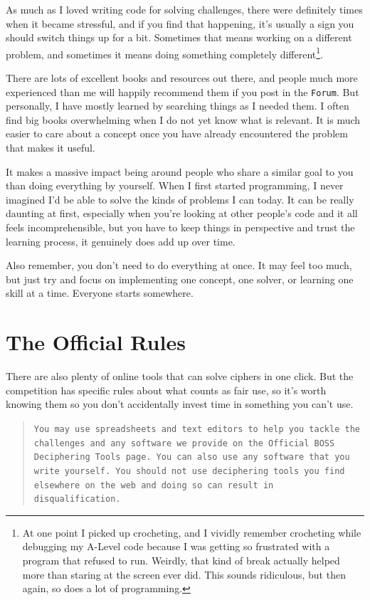 As much as I loved writing code for solving challenges, there were definitely times when it became stressful, and if you find that happening, it’s usually a sign you should switch things up for a bit. Sometimes that means working on a different problem, and sometimes it means doing something completely different\footnote{At one point I picked up crocheting, and I vividly remember crocheting while debugging my A-Level code because I was getting so frustrated with a program that refused to run. Weirdly, that kind of break actually helped more than staring at the screen ever did. This sounds ridiculous, but then again, so does a lot of programming.}. 

There are lots of excellent books and resources out there, and people much more experienced than me will happily recommend them if you post in the \texttt{Forum}. But personally, I have mostly learned by searching things as I needed them. I often find big books overwhelming when I do not yet know what is relevant. It is much easier to care about a concept once you have already encountered the problem that makes it useful.

It makes a massive impact being around people who share a similar goal to you than doing everything by yourself. When I first started programming, I never imagined I’d be able to solve the kinds of problems I can today. It can be really daunting at first, especially when you’re looking at other people’s code and it all feels incomprehensible, but you have to keep things in perspective and trust the learning process, it genuinely does add up over time. 

Also remember, you don’t need to do everything at once. It may feel too much, but just try and focus on implementing one concept, one solver, or learning one skill at a time. Everyone starts somewhere. 


\section{The Official Rules}

There are also plenty of online tools that can solve ciphers in one click. But the competition has specific rules about what counts as fair use, so it's worth knowing them so you don't accidentally invest time in something you can't use. 

\begin{quote}
    \texttt{You may use spreadsheets and text editors to help you tackle the challenges and any software we provide on the Official BOSS \\ Deciphering Tools page. You can also use any software that you write yourself. You should not use deciphering tools you find elsewhere on the web and doing so can result in disqualification.}
\end{quote}

